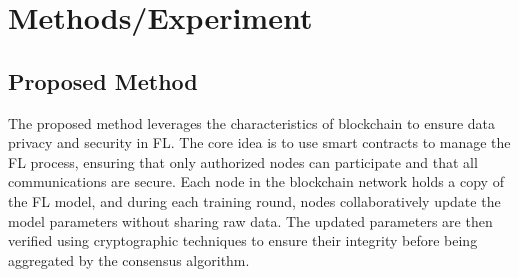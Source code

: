 \documentclass{article}
\begin{document}
\section{Methods/Experiment}
\subsection{Proposed Method}
The proposed method leverages the characteristics of blockchain to ensure data privacy and security in FL. The core idea is to use smart contracts to manage the FL process, ensuring that only authorized nodes can participate and that all communications are secure. Each node in the blockchain network holds a copy of the FL model, and during each training round, nodes collaboratively update the model parameters without sharing raw data. The updated parameters are then verified using cryptographic techniques to ensure their integrity before being aggregated by the consensus algorithm.
\end{document}
